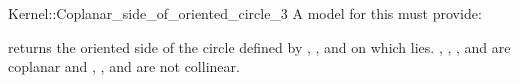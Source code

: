 \begin{ccRefFunctionObjectConcept}{Kernel::Coplanar_side_of_oriented_circle_3}
A model for this must provide:


         {returns the oriented side of the circle defined
          by , , and  on which  lies.
          \ccPrecond {}, , , and  are coplanar and
          , , and  are not collinear.}

\end{ccRefFunctionObjectConcept}


